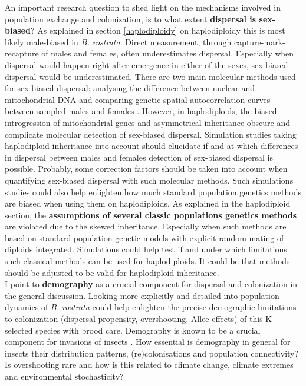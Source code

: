 \documentclass[10pt, twoside]{book} %
\begin{document}
	An important research question to shed light on the mechanisms involved in population exchange and colonization, is to what extent\textbf{ dispersal is sex-biased}? As explained in section \ref{haplodiploidy} on haplodiploidy this is most likely male-biased in \textit{B. rostrata}. Direct measurement, through capture-mark-recapture of males and females, often underestimates dispersal. Especially when dispersal would happen right after emergence in either of the sexes, sex-biased dispersal would be underestimated. There are two main molecular methods used for sex-biased dispersal: analysing the difference between nuclear and mitochondrial DNA \citep[with the latter only maternally inherited;][]{hardy2008} and comparing genetic spatial autocorrelation curves between sampled males and females \citep{banks2012}. However, in haplodiploids, the biased introgression of mitochondrial genes \citep{patten2015} and asymmetrical inheritance obscure and complicate molecular detection of sex-biased dispersal. Simulation studies taking haplodiploid inheritance into account should elucidate if and at which differences in dispersal between males and females detection of sex-biased dispersal is possible. Probably, some correction factors should be taken into account when quantifying sex-biased dispersal with such molecular methods. Such simulations studies could also help enlighten how much standard population genetics methods are biased when using them on haplodiploids. As explained in the haplodiploid section, the \textbf{assumptions of several classic populations genetics methods} are violated due to the skewed inheritance. Especially when such methods are based on standard population genetic models with explicit random mating of diploids integrated. Simulations could help test if and under which limitations such classical methods can be used for haplodiploids. It could be that methods should be adjusted to be valid for haplodiploid inheritance.\\
	
	I point to \textbf{demography} as a crucial component for dispersal and colonization in the general discussion. Looking more explicitly and detailed into population dynamics of \textit{B. rostrata} could help enlighten the precise demographic limitations to colonization (dispersal propensity, overshooting, Allee effects) of this K-selected species with brood care. Demography is known to be a crucial component for invasions of insects \citep{lockwood2005, chase2022}. How essential is demography in general for insects their distribution patterns, (re)colonisations and population connectivity? Is overshooting rare and how is this related to climate change, climate extremes and environmental stochasticity?\\
	
\end{document}
